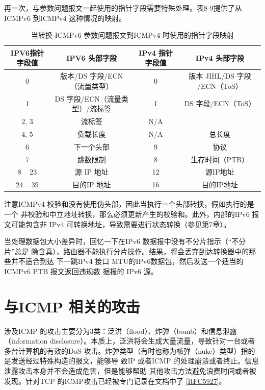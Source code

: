 再一次，与参数问题报文一起使用的指针字段需要特殊处理。表8-9提供了从 ICMPv6
到ICMPv4 这种情况的映射。

\begin{table}[H]
  \scriptsize
  \centering
  \caption{当转换 ICMPv6 参数问题报文到ICMPv4 时使用的指针字段映射}
  \begin{tabular}{c|c|c|c}
    \hline
    IPV6指针字段值  &  IPV6 头部字段  &  IPv4 指针字段值  &  IPv4 头部字段    \\ \hline
    0 & 版本/DS 字段/ECN（流量类型） & 0 & 版本 JIHL/DS 字段 /ECN（ToS） \\ \hline
    1 & DS 字段/ECN（流量类型）/流标签 & 1 & DS 字段/ECN（ToS） \\ \hline
    2, 3 & 流标签 & N/A &  \\ \hline
    4, 5 & 负载长度 & N/A & 总长度 \\ \hline
    6 & 下一个头部 & 9 & 协议 \\ \hline
    7 & 跳数限制 & 8 & 生存时间（PTB） \\ \hline
    8 ~ 23 & 源 IP 地址 & 12 & 源IP地址 \\ \hline
    24 ~ 39 & 目的IP 地址 & 16 & 目的IP地址 \\ \hline
  \end{tabular}
\end{table}

注意ICMPv4 校验和没有使用伪头部，因此当执行一个头部转换，假如执行的是一个
非校验和中立地址转换，那么必须更新产生的校验和。此外，内部的IPv6 报文可能包含非
IPv4 可转换地址，导致需要进行状态转换（参见第7章）。

当处理数据包大小差异时，回忆一下在IPv6 数据报中没有不分片指示（“不分片”总是
隐含真），路由器不能执行分片操作。结果，将会丢弃到达转换器中的那些并不适合到达
下一跳IPv4 接口 MTU的IPv6数据包，然后发送一个适当的ICMPv6 PTB 报文返回违规数
据报的 IPv6 源。

\section{与ICMP 相关的攻击}

涉及ICMP 的攻击主要分为3类：泛洪（flood）、炸弹（bomb）和信息泄露 （information
disclosure）。本质上，泛洪将会生成大量流量，导致针对一台或者多台计算机的有效的DoS
攻击。炸弹类型（有时也称为核弹（nuke）类型）指的是发送经过特殊构造的报文，能够导
致IP 或者ICMP 的处理崩溃或者终止。信息泄露攻击本身并不会造成危害，但是能够帮助
其他攻击方法避免浪费时间或者被发现。针对TCP 的ICMP攻击已经被专门记录在文档中了
\href{https://www.rfc-editor.org/rfc/rfc5927}{[RFC5927]}。

